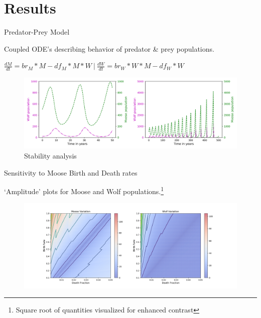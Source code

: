 \documentclass{beamer}
\begin{document}
\section{Results}
\begin{frame}{Predator-Prey Model}
	\item Coupled ODE's describing behavior of predator \& prey populations.
	\item
$\frac{dM}{dt}=br_{M}*M-df_{M}*M*W \ |\  \frac{dW}{dt}=br_{W}*W*M-df_{W}*W$	
		\begin{figure}
		\includegraphics[scale=0.35]{../plot_notebooks/short_and_long_runs}
		\caption{Stability analysis}
		\end{figure}
\end{frame}

\begin{frame}{Sensitivity to Moose Birth and Death rates}
	\item `Amplitude' plots for Moose and Wolf populations.\footnote{Square root of quantities visualized for enhanced contrast}
	\begin{figure}
		\vspace*{-0.25cm}\hspace*{-1.1cm}\includegraphics[scale=0.35]{../plot_notebooks/sqrt_amp_vary_M}
	\end{figure}
\end{frame}
\end{document}
